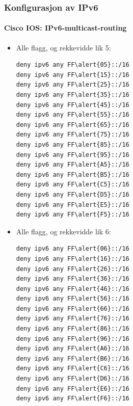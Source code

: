\begin{frame}[fragile]%
  \frametitle{Konfigurasjon av IPv6}
  \framesubtitle{Cisco IOS: IPv6-multicast-routing}
  \begin{multicols}{2}
    \begin{itemize}%
    \item Alle flagg, og rekkevidde lik 5:
\begin{Verbatim}[commandchars=\\\{\},fontsize=\scriptsize]
deny ipv6 any FF\alert{05}::/16
deny ipv6 any FF\alert{15}::/16
deny ipv6 any FF\alert{25}::/16
deny ipv6 any FF\alert{35}::/16
deny ipv6 any FF\alert{45}::/16
deny ipv6 any FF\alert{55}::/16
deny ipv6 any FF\alert{65}::/16
deny ipv6 any FF\alert{75}::/16
deny ipv6 any FF\alert{85}::/16
deny ipv6 any FF\alert{95}::/16
deny ipv6 any FF\alert{A5}::/16
deny ipv6 any FF\alert{B5}::/16
deny ipv6 any FF\alert{C5}::/16
deny ipv6 any FF\alert{D5}::/16
deny ipv6 any FF\alert{E5}::/16
deny ipv6 any FF\alert{F5}::/16
\end{Verbatim}
    \item Alle flagg, og rekkevidde lik 6:
\begin{Verbatim}[commandchars=\\\{\},fontsize=\scriptsize]
deny ipv6 any FF\alert{06}::/16
deny ipv6 any FF\alert{16}::/16
deny ipv6 any FF\alert{26}::/16
deny ipv6 any FF\alert{36}::/16
deny ipv6 any FF\alert{46}::/16
deny ipv6 any FF\alert{56}::/16
deny ipv6 any FF\alert{66}::/16
deny ipv6 any FF\alert{76}::/16
deny ipv6 any FF\alert{86}::/16
deny ipv6 any FF\alert{96}::/16
deny ipv6 any FF\alert{A6}::/16
deny ipv6 any FF\alert{B6}::/16
deny ipv6 any FF\alert{C6}::/16
deny ipv6 any FF\alert{D6}::/16
deny ipv6 any FF\alert{E6}::/16
deny ipv6 any FF\alert{F6}::/16
\end{Verbatim}
    \end{itemize}
  \end{multicols}
\end{frame}

